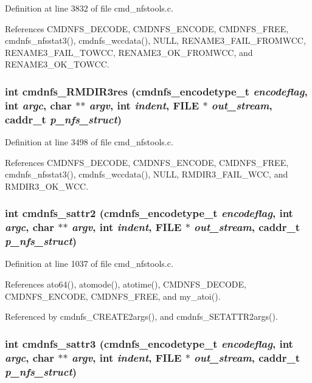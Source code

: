 Definition at line 3832 of file cmd\_\-nfstools.c.

References CMDNFS\_\-DECODE, CMDNFS\_\-ENCODE, CMDNFS\_\-FREE, cmdnfs\_\-nfsstat3(), cmdnfs\_\-wccdata(), NULL, RENAME3\_\-FAIL\_\-FROMWCC, RENAME3\_\-FAIL\_\-TOWCC, RENAME3\_\-OK\_\-FROMWCC, and RENAME3\_\-OK\_\-TOWCC.
\subsubsection{\setlength{\rightskip}{0pt plus 5cm}int cmdnfs\_\-RMDIR3res ({\bf cmdnfs\_\-encodetype\_\-t} {\em encodeflag}, int {\em argc}, char $\ast$$\ast$ {\em argv}, int {\em indent}, FILE $\ast$ {\em out\_\-stream}, caddr\_\-t {\em p\_\-nfs\_\-struct})}\label{cmd__nfstools_8c_a107}




Definition at line 3498 of file cmd\_\-nfstools.c.

References CMDNFS\_\-DECODE, CMDNFS\_\-ENCODE, CMDNFS\_\-FREE, cmdnfs\_\-nfsstat3(), cmdnfs\_\-wccdata(), NULL, RMDIR3\_\-FAIL\_\-WCC, and RMDIR3\_\-OK\_\-WCC.
\subsubsection{\setlength{\rightskip}{0pt plus 5cm}int cmdnfs\_\-sattr2 ({\bf cmdnfs\_\-encodetype\_\-t} {\em encodeflag}, int {\em argc}, char $\ast$$\ast$ {\em argv}, int {\em indent}, FILE $\ast$ {\em out\_\-stream}, caddr\_\-t {\em p\_\-nfs\_\-struct})}\label{cmd__nfstools_8c_a74}




Definition at line 1037 of file cmd\_\-nfstools.c.

References ato64(), atomode(), atotime(), CMDNFS\_\-DECODE, CMDNFS\_\-ENCODE, CMDNFS\_\-FREE, and my\_\-atoi().

Referenced by cmdnfs\_\-CREATE2args(), and cmdnfs\_\-SETATTR2args().
\subsubsection{\setlength{\rightskip}{0pt plus 5cm}int cmdnfs\_\-sattr3 ({\bf cmdnfs\_\-encodetype\_\-t} {\em encodeflag}, int {\em argc}, char $\ast$$\ast$ {\em argv}, int {\em indent}, FILE $\ast$ {\em out\_\-stream}, caddr\_\-t {\em p\_\-nfs\_\-struct})}\label{cmd__nfstools_8c_a83}





